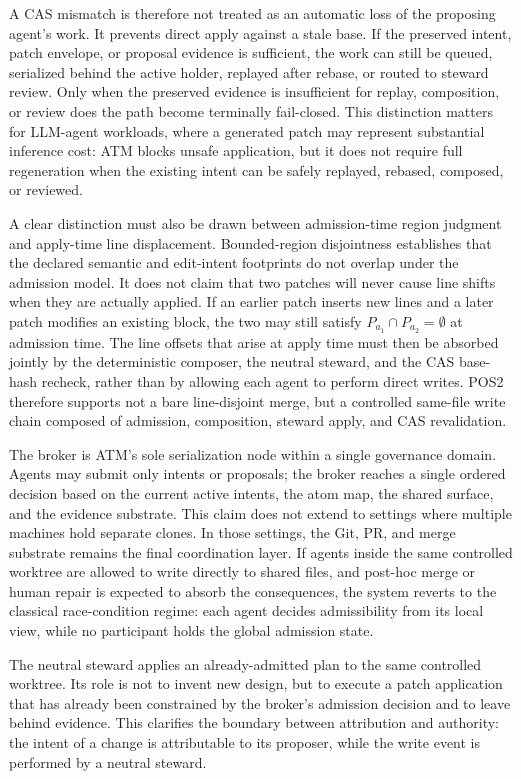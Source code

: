 \documentclass[9pt,letterpaper]{extarticle}
\begin{document}
A CAS mismatch is therefore not treated as an automatic loss of the proposing agent's work. It prevents direct apply against a stale base. If the preserved intent, patch envelope, or proposal evidence is sufficient, the work can still be queued, serialized behind the active holder, replayed after rebase, or routed to steward review. Only when the preserved evidence is insufficient for replay, composition, or review does the path become terminally fail-closed. This distinction matters for LLM-agent workloads, where a generated patch may represent substantial inference cost: ATM blocks unsafe application, but it does not require full regeneration when the existing intent can be safely replayed, rebased, composed, or reviewed.

A clear distinction must also be drawn between admission-time region judgment and apply-time line displacement. Bounded-region disjointness establishes that the declared semantic and edit-intent footprints do not overlap under the admission model. It does not claim that two patches will never cause line shifts when they are actually applied. If an earlier patch inserts new lines and a later patch modifies an existing block, the two may still satisfy $P_{a_1} \cap P_{a_2} = \emptyset$ at admission time. The line offsets that arise at apply time must then be absorbed jointly by the deterministic composer, the neutral steward, and the CAS base-hash recheck, rather than by allowing each agent to perform direct writes. POS2 therefore supports not a bare line-disjoint merge, but a controlled same-file write chain composed of admission, composition, steward apply, and CAS revalidation.

The broker is ATM's sole serialization node within a single governance domain. Agents may submit only intents or proposals; the broker reaches a single ordered decision based on the current active intents, the atom map, the shared surface, and the evidence substrate. This claim does not extend to settings where multiple machines hold separate clones. In those settings, the Git, PR, and merge substrate remains the final coordination layer. If agents inside the same controlled worktree are allowed to write directly to shared files, and post-hoc merge or human repair is expected to absorb the consequences, the system reverts to the classical race-condition regime: each agent decides admissibility from its local view, while no participant holds the global admission state.

The neutral steward applies an already-admitted plan to the same controlled worktree. Its role is not to invent new design, but to execute a patch application that has already been constrained by the broker's admission decision and to leave behind evidence. This clarifies the boundary between attribution and authority: the intent of a change is attributable to its proposer, while the write event is performed by a neutral steward.
\end{document}
